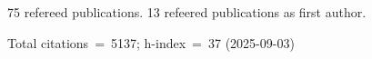 75 refereed publications. 13 refeered publications as first author.

Total citations~=~5137; h-index~=~37 (2025-09-03)